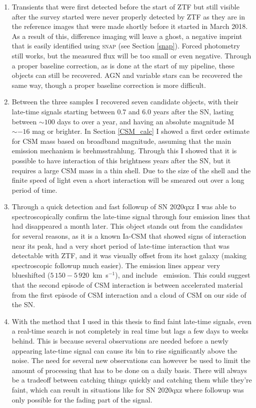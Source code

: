 \documentclass[a4paper,oneside,12pt, class=Latex/Classes/PhDthesisPSnPDF, crop=false]{standalone}
\begin{document}
\begin{enumerate}
	\item Transients that were first detected before the start of ZTF but still visible after the survey started were never properly detected by ZTF as they are in the reference images that were made shortly before it started in March 2018. As a result of this, difference imaging will leave a ghost, a negative imprint that is easily identified using \textsc{snap} (see Section \ref{snap}). Forced photometry still works, but the measured flux will be too small or even negative. Through a proper baseline correction, as is done at the start of my pipeline, these objects can still be recovered. AGN and variable stars can be recovered the same way, though a proper baseline correction is more difficult.
	\item Between the three samples I recovered seven candidate objects, with their late-time signals starting between 0.7 and 6.0 years after the SN, lasting between $\sim100$ days to over a year, and having an absolute magnitude M$\sim-16$ mag or brighter. In Section \ref{CSM_calc} I showed a first order estimate for CSM mass based on broadband magnitude, assuming that the main emission mechanism is brehmsstrahlung. Through this I showed that it is possible to have interaction of this brightness years after the SN, but it requires a large CSM mass in a thin shell. Due to the size of the shell and the finite speed of light even a short interaction will be smeared out over a long period of time.
	\item Through a quick detection and fast followup of SN 2020qxz I was able to spectroscopically confirm the late-time signal through four emission lines that had disappeared a month later. This object stands out from the candidates for several reasons, as it is a known Ia-CSM that showed signs of interaction near its peak, had a very short period of late-time interaction that was detectable with ZTF, and it was visually offset from its host galaxy (making spectroscopic followup much easier). The emission lines appear very blueshifted ($5\,150 - 5\,920$~km~s$^{-1}$), and include \Hbeta\ emission. This could suggest that the second episode of CSM interaction is between accelerated material from the first episode of CSM interaction and a cloud of CSM on our side of the SN.
	\item With the method that I used in this thesis to find faint late-time signals, even a real-time search is not completely in real time but lags a few days to weeks behind. This is because several observations are needed before a newly appearing late-time signal can cause its bin to rise significantly above the noise. The need for several new observations can however be used to limit the amount of processing that has to be done on a daily basis. There will always be a tradeoff between catching things quickly and catching them while they're faint, which can result in situations like for SN 2020qxz where followup was only possible for the fading part of the signal.

\end{enumerate}
\end{document}
